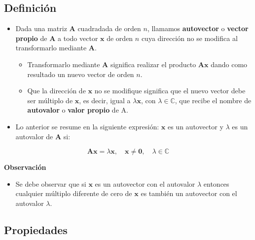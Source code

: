 \documentclass[openany]{book}
\providecommand{\tightlist}{%
  \setlength{\itemsep}{0pt}\setlength{\parskip}{0pt}}
\begin{document}
\hypertarget{definiciuxf3n}{%
\subsection{Definición}\label{definiciuxf3n}}

\begin{itemize}
\item
  Dada una matriz \(\textbf{A}\) cuadradada de orden \(n\), llamamos \textbf{autovector} o \textbf{vector propio} de \(\textbf{A}\) a todo vector \(\textbf{x}\) de orden \(n\) cuya dirección no se modifica al transformarlo mediante \(\textbf{A}\).

  \begin{itemize}
  \tightlist
  \item
    Transformarlo mediante \(\textbf{A}\) significa realizar el producto \(\textbf{Ax}\) dando como resultado un nuevo vector de orden \(n\).
  \item
    Que la dirección de \(\textbf{x}\) no se modifique significa que el nuevo vector debe ser múltiplo de \(\textbf{x}\), es decir, igual a \(\lambda \textbf{x}\), con \(\lambda \in \mathbb{C}\), que recibe el nombre de \textbf{autovalor} o \textbf{valor propio} de A.
  \end{itemize}
\item
  Lo anterior se resume en la siguiente expresión: \(\textbf{x}\) es un autovector y \(\lambda\) es un autovalor de \(\textbf{A}\) si:
\end{itemize}

\[\textbf{Ax} = \lambda \textbf{x}, \quad \textbf{x} \neq \textbf{0}, \quad \lambda \in \mathbb{C}\]

\textbf{Observación}

\begin{itemize}
\tightlist
\item
  Se debe observar que si \(\textbf{x}\) es un autovector con el autovalor \(\lambda\) entonces cualquier múltiplo diferente de cero de \(\textbf{x}\) es también un autovector con el autovalor \(\lambda\).
\end{itemize}

\hypertarget{propiedades}{%
\subsection{Propiedades}\label{propiedades}}
\end{document}
